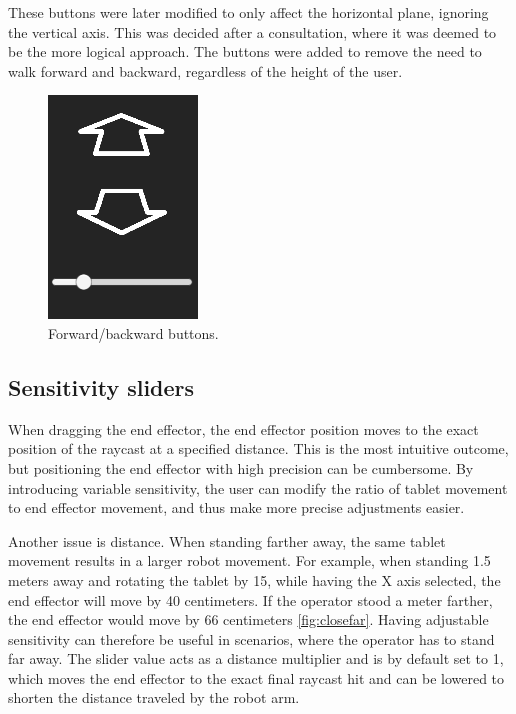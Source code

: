 These buttons were later modified to only affect the horizontal plane, ignoring the vertical axis. This was decided after a consultation, where it was deemed to be the more logical approach. The buttons were added to remove the need to walk forward and backward, regardless of the height of the user. 
\\
\begin{figure}[H]
    \centering
    \includegraphics{obrazky-figures/forwardbackwardbuttons.png}
    \caption{Forward/backward buttons.}
    \label{fig:forwardbackwardbuttons}
\end{figure}

\subsection{Sensitivity sliders}

When dragging the end effector, the end effector position moves to the exact position of the raycast at a specified distance. This is the most intuitive outcome, but positioning the end effector with high precision can be cumbersome. By introducing variable sensitivity, the user can modify the ratio of tablet movement to end effector movement, and thus make more precise adjustments easier. 

Another issue is distance. When standing farther away, the same tablet movement results in a larger robot movement. For example, when standing 1.5 meters away and rotating the tablet by 15\degree, while having the X axis selected, the end effector will move by 40 centimeters. If the operator stood a meter farther, the end effector would move by 66 centimeters \ref{fig:closefar}. Having adjustable sensitivity can therefore be useful in scenarios, where the operator has to stand far away. The slider value acts as a distance multiplier and is by default set to 1, which moves the end effector to the exact final raycast hit and can be lowered to shorten the distance traveled by the robot arm. 

